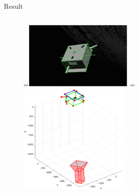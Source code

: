 \documentclass[10pt]{beamer}
\begin{document}
\begin{frame}{Result}
\begin{columns}[T,onlytextwidth]
\begin{column}{0.5\textwidth}
      \begin{figure}
        \centering
        \captionsetup[subfigure]{labelformat=empty}
        =\hbox{\includegraphics[width=0.48\textwidth]{gfx/poseDetermination/trial311modelMap.eps}}%
        =\hbox{\includegraphics[width=0.48\textwidth]{gfx/poseDetermination/cameraWRTSC311.eps}}%
        {\,} \hfill
         \hfill
         \hfill
        {\,}
      \end{figure}
    \end{column}
  \end{columns}


\end{frame}
\end{document}
